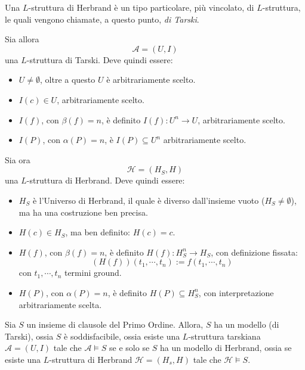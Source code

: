 \begin{defi}
        Una $L$-struttura di Herbrand è un tipo particolare, più vincolato, 
        di $L$-struttura, le quali vengono chiamate, a questo punto, \textit{di Tarski}. 

        Sia allora 
        $$
        \mathcal{A} = (U,I) 
        $$
        una $L$-struttura di Tarski. Deve quindi essere: 
        \begin{itemize}
                \item $U \neq \emptyset$, oltre a questo $U$ è arbitrariamente 
                       scelto. 
                \item $I(c) \in U$, arbitrariamente scelto. 
                \item $I(f)$, con $\beta(f) = n$, è definito $I(f): U^n \rightarrow U$, 
                        arbitrariamente scelto. 
                \item $I(P)$, con $\alpha(P) = n$, è $I(P) \subseteq U^n$ arbitrariamente scelto. 
        \end{itemize}

        Sia ora 
        $$
        \mathcal{H} = (H_S, H)
        $$
        una $L$-struttura di Herbrand. Deve quindi essere: 
        \begin{itemize}
                \item $H_S$ è l'Universo di Herbrand, il quale è diverso 
                        dall'insieme vuoto ($H_S \neq \emptyset$), ma ha 
                        una costruzione ben precisa. 
                \item $H(c) \in H_S$, ma ben definito: $H(c) = c$. 
                \item $H(f)$, con $\beta(f) = n$, è definito $H(f): H_S^n \rightarrow H_S$, 
                        con definizione fissata: 
                        $$
                        (H(f))(t_1, \cdots, t_n) := f(t_1, \cdots, t_n)
                        $$
                        con $t_1, \cdots, t_n$ termini ground.
                \item $H(P)$, con $\alpha(P) = n$, è definito $H(P) \subseteq H_S^n$, 
                        con interpretazione arbitrariamente scelta. 
        \end{itemize}
\end{defi}

\begin{defi}
        Sia $S$ un insieme di clausole del Primo Ordine. Allora, 
        $S$ ha un modello (di Tarski), ossia $S$ è soddisfacibile, 
        ossia esiste una $L$-struttura tarskiana $\mathcal{A} = (U,I)$ tale 
        che $\mathcal{A} \models S$ se e solo se 
        $S$ ha un modello di Herbrand, ossia se esiste una $L$-struttura di 
        Herbrand $\mathcal{H}=(H_s, H)$ tale che $\mathcal{H} \models S$. 
\end{defi}

